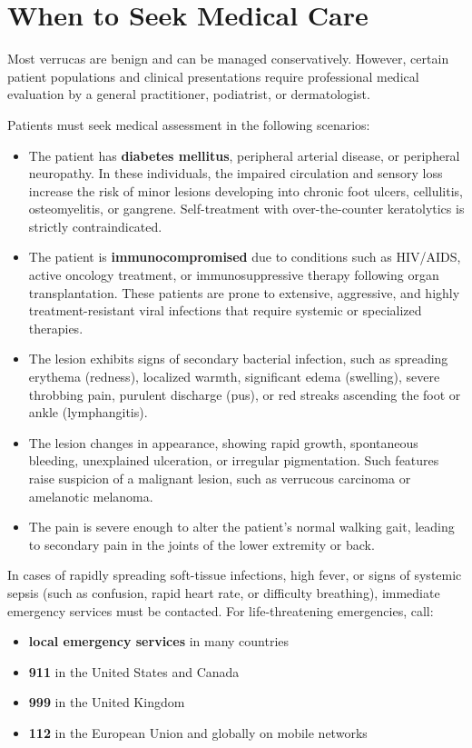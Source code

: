 \section*{When to Seek Medical Care}
Most verrucas are benign and can be managed conservatively. However, certain patient populations and clinical presentations require professional medical evaluation by a general practitioner, podiatrist, or dermatologist.

Patients must seek medical assessment in the following scenarios:
\begin{itemize}
    \item The patient has \textbf{diabetes mellitus}, peripheral arterial disease, or peripheral neuropathy. In these individuals, the impaired circulation and sensory loss increase the risk of minor lesions developing into chronic foot ulcers, cellulitis, osteomyelitis, or gangrene. Self-treatment with over-the-counter keratolytics is strictly contraindicated.
    \item The patient is \textbf{immunocompromised} due to conditions such as HIV/AIDS, active oncology treatment, or immunosuppressive therapy following organ transplantation. These patients are prone to extensive, aggressive, and highly treatment-resistant viral infections that require systemic or specialized therapies.
    \item The lesion exhibits signs of secondary bacterial infection, such as spreading erythema (redness), localized warmth, significant edema (swelling), severe throbbing pain, purulent discharge (pus), or red streaks ascending the foot or ankle (lymphangitis).
    \item The lesion changes in appearance, showing rapid growth, spontaneous bleeding, unexplained ulceration, or irregular pigmentation. Such features raise suspicion of a malignant lesion, such as verrucous carcinoma or amelanotic melanoma.
    \item The pain is severe enough to alter the patient's normal walking gait, leading to secondary pain in the joints of the lower extremity or back.
\end{itemize}

In cases of rapidly spreading soft-tissue infections, high fever, or signs of systemic sepsis (such as confusion, rapid heart rate, or difficulty breathing), immediate emergency services must be contacted. For life-threatening emergencies, call:
\begin{itemize}
    \item \textbf{local emergency services} in many countries
    \item \textbf{911} in the United States and Canada
    \item \textbf{999} in the United Kingdom
    \item \textbf{112} in the European Union and globally on mobile networks
\end{itemize}

